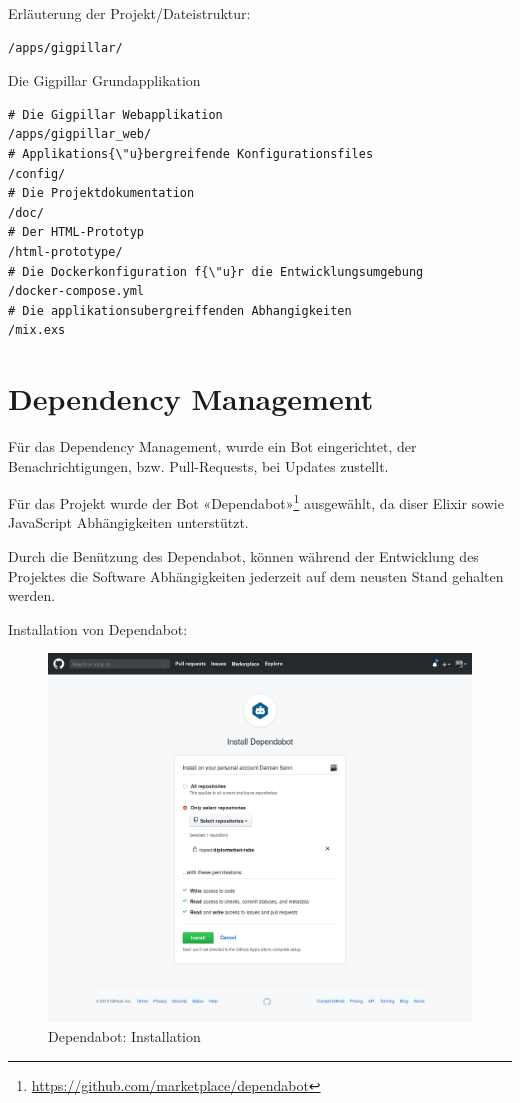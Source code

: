 \noindent
Erläuterung der Projekt/Dateistruktur:

\begin{lstlisting}[frame=single]
/apps/gigpillar/
\end{lstlisting}
Die Gigpillar Grundapplikation

\begin{lstlisting}[frame=single]
# Die Gigpillar Webapplikation
/apps/gigpillar_web/
# Applikations{\"u}bergreifende Konfigurationsfiles
/config/
# Die Projektdokumentation
/doc/
# Der HTML-Prototyp
/html-prototype/
# Die Dockerkonfiguration f{\"u}r die Entwicklungsumgebung
/docker-compose.yml
# Die applikationsubergreiffenden Abhangigkeiten
/mix.exs
\end{lstlisting}

\clearpage
\section{Dependency Management}

Für das Dependency Management, wurde ein Bot eingerichtet, der
Benachrichtigungen, bzw. Pull-Requests, bei Updates zustellt.

Für das Projekt wurde der Bot «Dependabot»\footnote{\url{https://github.com/marketplace/dependabot}} ausgewählt, da diser Elixir sowie JavaScript Abhängigkeiten unterstützt.

Durch die Benützung des Dependabot, können während der Entwicklung des Projektes
die Software Abhängigkeiten jederzeit auf dem neusten Stand gehalten werden.

\noindent{}Installation von Dependabot:

\begin{figure}[!htb]
  \centering
  \includegraphics[width=1\textwidth]{realisierung/install-dependabot-1.png}
  \caption{Dependabot: Installation}
\end{figure}

